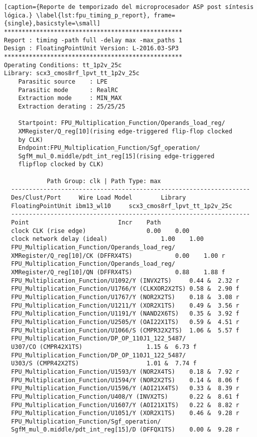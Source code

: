 \begin{lstlisting}[caption={Reporte de temporizado del microprocesador ASP post síntesis lógica.} \label{lst:fpu_timing_p_report}, frame={single},basicstyle=\small]
**************************************************
Report : timing -path full -delay max -max_paths 1
Design : FloatingPointUnit Version: L-2016.03-SP3
**************************************************
Operating Conditions: tt_1p2v_25c
Library: scx3_cmos8rf_lpvt_tt_1p2v_25c
	Parasitic source    : LPE
	Parasitic mode      : RealRC
	Extraction mode     : MIN_MAX
	Extraction derating : 25/25/25
	
    Startpoint: FPU_Multiplication_Function/Operands_load_reg/
    XMRegister/Q_reg[10](rising edge-triggered flip-flop clocked
    by CLK)
    Endpoint:FPU_Multiplication_Function/Sgf_operation/
    SgfM_mul_0.middle/pdt_int_reg[15](rising edge-triggered 
    flipflop clocked by CLK)
    
    		Path Group: clk | Path Type: max
  -------------------------------------------------------------------
  Des/Clust/Port     Wire Load Model       	Library
  FloatingPointUnit	ibm13_wl10     scx3_cmos8rf_lpvt_tt_1p2v_25c
  -------------------------------------------------------------------
  Point							Incr	Path
  clock CLK (rise edge)					0.00	0.00
  clock network delay (ideal)				1.00	1.00
  FPU_Multiplication_Function/Operands_load_reg/
  XMRegister/Q_reg[10]/CK (DFFRX4TS)			0.00	1.00 r
  FPU_Multiplication_Function/Operands_load_reg/
  XMRegister/Q_reg[10]/QN (DFFRX4TS)			0.88	1.88 f
  FPU_Multiplication_Function/U1092/Y (INVX2TS)		0.44 &	2.32 r
  FPU_Multiplication_Function/U1766/Y (CLKXOR2X2TS)	0.58 &	2.90 f
  FPU_Multiplication_Function/U1767/Y (NOR2X2TS)	0.18 &	3.08 r
  FPU_Multiplication_Function/U1211/Y (XOR2X1TS)	0.49 &	3.56 r
  FPU_Multiplication_Function/U1191/Y (NAND2X6TS)	0.35 &	3.92 f
  FPU_Multiplication_Function/U2505/Y (OAI22X1TS)	0.59 &	4.51 r
  FPU_Multiplication_Function/U1066/S (CMPR32X2TS)	1.06 &	5.57 f
  FPU_Multiplication_Function/DP_OP_110J1_122_5487/
  U307/CO (CMPR42X1TS)					1.15 &	6.73 f
  FPU_Multiplication_Function/DP_OP_110J1_122_5487/
  U303/S (CMPR42X2TS)					1.01 &	7.74 f
  FPU_Multiplication_Function/U1593/Y (NOR2X4TS)	0.18 &	7.92 r
  FPU_Multiplication_Function/U1594/Y (NOR2X2TS)	0.14 &	8.06 f
  FPU_Multiplication_Function/U1596/Y (AOI21X4TS)	0.33 &	8.39 r
  FPU_Multiplication_Function/U408/Y (INVX2TS)		0.22 &	8.61 f
  FPU_Multiplication_Function/U1607/Y (AOI21X1TS)	0.22 &	8.82 r
  FPU_Multiplication_Function/U1051/Y (XOR2X1TS)	0.46 &	9.28 r
  FPU_Multiplication_Function/Sgf_operation/
  SgfM_mul_0.middle/pdt_int_reg[15]/D (DFFQX1TS)	0.00 &	9.28 r
  

\end{lstlisting}

